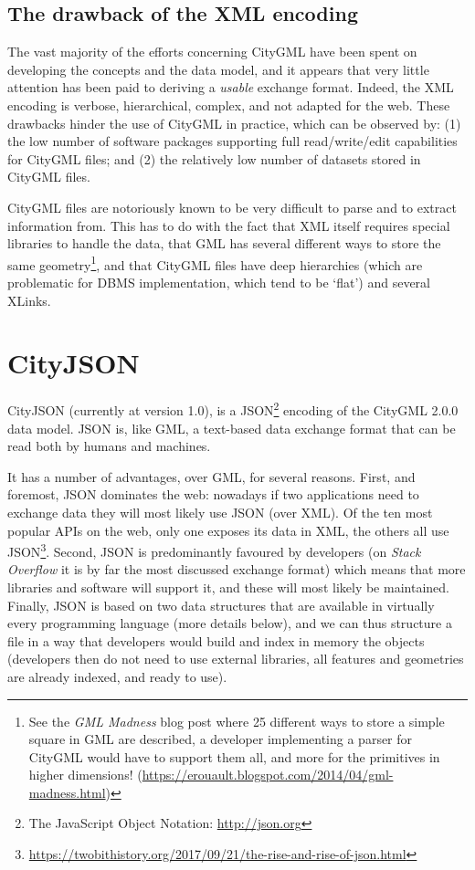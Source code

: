 

\subsection{The drawback of the XML encoding}

The vast majority of the efforts concerning CityGML have been spent on developing the concepts and the data model, and it appears that very little attention has been paid to deriving a \emph{usable} exchange format.
Indeed, the XML encoding is verbose, hierarchical, complex, and not adapted for the web.
These drawbacks hinder the use of CityGML in practice, which can be observed by: (1) the low number of software packages supporting full read/write/edit capabilities for CityGML files; and (2) the relatively low number of datasets stored in CityGML files.

CityGML files are notoriously known to be very difficult to parse and to extract information from.
This has to do with the fact that XML itself requires special libraries to handle the data, that GML has several different ways to store the same geometry\footnote{See the \emph{GML Madness} blog post where 25 different ways to store a simple square in GML are described, a developer implementing a parser for CityGML would have to support them all, and more for the primitives in higher dimensions! (\url{https://erouault.blogspot.com/2014/04/gml-madness.html})}, and that CityGML files have deep hierarchies (which are problematic for DBMS implementation, which tend to be `flat') and several XLinks.



\section{CityJSON}

CityJSON (currently at version 1.0), is a JSON\footnote{The JavaScript Object Notation: \url{http://json.org}} encoding of the CityGML 2.0.0 data model.
JSON is, like GML, a text-based data exchange format that can be read both by humans and machines.

It has a number of advantages, over GML, for several reasons.
First, and foremost, JSON dominates the web: nowadays if two applications need to exchange data they will most likely use JSON (over XML).
Of the ten most popular APIs on the web, only one exposes its data in XML, the others all use JSON\footnote{\url{https://twobithistory.org/2017/09/21/the-rise-and-rise-of-json.html}}.
Second, JSON is predominantly favoured by developers (on \emph{Stack Overflow} it is by far the most discussed exchange format) which means that more libraries and software will support it, and these will most likely be maintained.
Finally, JSON is based on two data structures that are available in virtually every programming language (more details below), and we can thus structure a file in a way that  developers would build and index in memory the objects (developers then do not need to use external libraries, all features and geometries are already indexed, and ready to use). 

